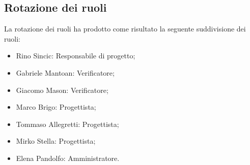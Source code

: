 \subsection{Rotazione dei ruoli}
La rotazione dei ruoli ha prodotto come risultato la seguente suddivisione dei ruoli:
\begin{itemize}
        \item Rino Sincic: Responsabile di progetto;
	\item Gabriele Mantoan: Verificatore;
	\item Giacomo Mason: Verificatore;
	\item Marco Brigo: Progettista;
	\item Tommaso Allegretti: Progettista;
	\item Mirko Stella: Progettista;
	\item Elena Pandolfo: Amministratore.
\end{itemize}
